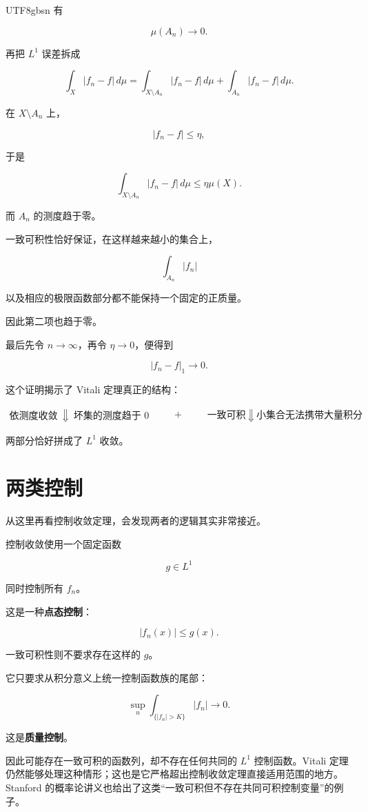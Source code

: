 \documentclass[11pt]{article}
\begin{document}
\begin{CJK*}{UTF8}{gbsn}
有

\[
\mu(A_n)\to0.
\]

再把 $L^1$ 误差拆成

\[
\int_X|f_n-f|\,d\mu
=
\int_{X\setminus A_n}|f_n-f|\,d\mu
+
\int_{A_n}|f_n-f|\,d\mu.
\]

在 $X\setminus A_n$ 上，

\[
|f_n-f|\leq\eta,
\]

于是

\[
\int_{X\setminus A_n}|f_n-f|\,d\mu
\leq
\eta\mu(X).
\]

而 $A_n$ 的测度趋于零。

一致可积性恰好保证，在这样越来越小的集合上，

\[
\int_{A_n}|f_n|
\]

以及相应的极限函数部分都不能保持一个固定的正质量。

因此第二项也趋于零。

最后先令 $n\to\infty$，再令 $\eta\to0$，便得到

\[
|f_n-f|_1\to0.
\]

这个证明揭示了 Vitali 定理真正的结构：

\[
\boxed{
\begin{array}{c}
\text{依测度收敛}\
\Downarrow\
\text{坏集的测度趋于 }0
\end{array}
\qquad+\qquad
\begin{array}{c}
\text{一致可积}\
\Downarrow\
\text{小集合无法携带大量积分}
\end{array}
}
\]

两部分恰好拼成了 $L^1$ 收敛。


\section{两类控制}


从这里再看控制收敛定理，会发现两者的逻辑其实非常接近。

控制收敛使用一个固定函数

\[
g\in L^1
\]

同时控制所有 $f_n$。

这是一种\textbf{点态控制}：

\[
|f_n(x)|\leq g(x).
\]

一致可积性则不要求存在这样的 $g$。

它只要求从积分意义上统一控制函数族的尾部：

\[
\sup_n
\int_{\{|f_n|>K\}}|f_n|
\to0.
\]

这是\textbf{质量控制}。

因此可能存在一致可积的函数列，却不存在任何共同的 $L^1$ 控制函数。Vitali 定理仍然能够处理这种情形；这也是它严格超出控制收敛定理直接适用范围的地方。Stanford 的概率论讲义也给出了这类“一致可积但不存在共同可积控制变量”的例子。


\end{CJK*}
\end{document}
